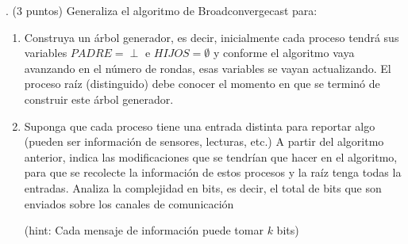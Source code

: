 . (3 puntos) Generaliza el algoritmo de Broadconvergecast para:

\begin{enumerate}
	\item Construya un árbol generador, es decir, inicialmente cada proceso tendrá sus variables $PADRE = \perp$ e $HIJOS = \emptyset$ y conforme el algoritmo vaya avanzando en el número de rondas, esas variables se vayan actualizando. El proceso raíz (distinguido) debe conocer el momento en que se terminó de construir este árbol generador.

	\item Suponga que cada proceso tiene una entrada distinta para reportar algo (pueden ser información de sensores, lecturas, etc.) A partir del algoritmo anterior, indica las modificaciones que se tendrían que hacer en el algoritmo, para que se recolecte la información de estos procesos y la raíz tenga todas la entradas. Analiza la complejidad en bits, es decir, el total de bits que son enviados sobre los canales de comunicación

(hint: Cada mensaje de información puede tomar $k$ bits)
\end{enumerate}

